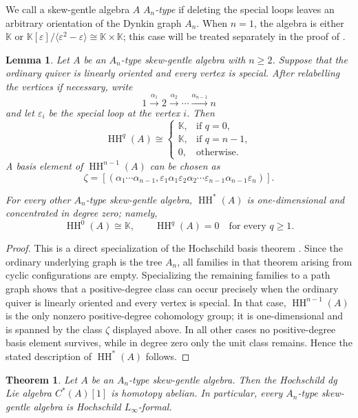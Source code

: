 \documentclass[11pt,a4paper,reqno]{amsart}
\newcommand{\mK}{\mathbb K}
\newcommand{\HH}{\operatorname{HH}}
\newcommand{\para}[2]{(#1,#2)}
\newcommand{\ep}{\varepsilon}
\theoremstyle{plain}
\newtheorem{theorem}{Theorem}[section]
\newtheorem{lemma}[lemma]{Lemma}
\theoremstyle{definition}
\numberwithin{equation}{section}
\begin{document}
	We call a skew-gentle algebra $A$ \emph{$A_n$-type} if deleting the special
	loops leaves an arbitrary orientation of the Dynkin graph $A_n$.  When $n=1$,
	the algebra is either $\mK$ or
	$\mK[\ep]/\langle \ep^2-\ep \rangle \cong\mK\times\mK$; this case will be treated separately
	in the proof of .
	
\begin{lemma}
	\label{lem:An-Hochschild-cohomology}
	Let $A$ be an $A_n$-type skew-gentle algebra with $n\geq2$.
	Suppose that the ordinary quiver is linearly oriented and every vertex is
	special. After relabelling the vertices if necessary, write
	\[
	1\xrightarrow{\alpha_1}2\xrightarrow{\alpha_2}\cdots
	\xrightarrow{\alpha_{n-1}}n
	\]
	and let $\ep_i$ be the special loop at the vertex $i$. Then
	\[
	\HH^q(A)\cong
	\begin{cases}
		\mK, & \text{if }q=0,\\
		\mK, &\text{if }q=n-1,\\
		0, & \text{otherwise}.
	\end{cases}
	\]
	A basis element of $\HH^{n-1}(A)$ can be chosen as
	\[
	\zeta
	=
	\left[
	\para{\alpha_1\cdots\alpha_{n-1}}
	{\ep_1\alpha_1\ep_2\alpha_2\cdots
		\ep_{n-1}\alpha_{n-1}\ep_n}
	\right].
	\]
	
	For every other $A_n$-type skew-gentle algebra,
	$\HH^*(A)$ is one-dimensional and concentrated in degree zero; namely,
	\[
	\HH^0(A)\cong\mK,
	\qquad
	\HH^q(A)=0
	\quad\text{for every }q\geq1.
	\]
\end{lemma}
	
	\begin{proof}
		This is a direct specialization of the Hochschild basis theorem
		\cite[Theorem~3.15]{BSSWW26}. Since the ordinary underlying graph is the
		tree $A_n$, all families in that theorem arising from cyclic configurations
		are empty. Specializing the remaining families to a path graph shows that a
		positive-degree class can occur precisely when the ordinary quiver is
		linearly oriented and every vertex is special. 
		In that case, $\HH^{n-1}(A)$ is the only nonzero positive-degree
		cohomology group; it is one-dimensional and is spanned by the
		class $\zeta$ displayed above.
		In all other cases no positive-degree basis element survives, while in
		degree zero only the unit class remains. Hence the stated description of
		$\HH^*(A)$ follows.
	\end{proof}
	
	
	\begin{theorem}
		\label{thm:An-formality}
		Let $A$ be an $A_n$-type skew-gentle algebra. Then the Hochschild dg Lie
		algebra $C^*(A)[1]$ is homotopy abelian. In particular, every $A_n$-type
		skew-gentle algebra is Hochschild $L_\infty$-formal.
	\end{theorem}
	
\end{document}
